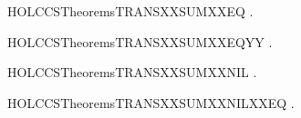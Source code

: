 \newcommand{\HOLCCSTheoremsTRANSXXSUM}{\UseVerbatim{HOLCCSTheoremsTRANSXXSUM}}
\begin{SaveVerbatim}{HOLCCSTheoremsTRANSXXSUMXXEQ}
\HOLTokenTurnstile{} \HOLSymConst{\HOLTokenForall{}}   .  \HOLSymConst{\ensuremath{+}}  \HOLTokenTransBegin{}\HOLTokenTransEnd {} \HOLSymConst{\HOLTokenEquiv{}}  \HOLTokenTransBegin{}\HOLTokenTransEnd {} \HOLSymConst{\HOLTokenDisj{}}  \HOLTokenTransBegin{}\HOLTokenTransEnd {}
\end{SaveVerbatim}
\newcommand{\HOLCCSTheoremsTRANSXXSUMXXEQ}{\UseVerbatim{HOLCCSTheoremsTRANSXXSUMXXEQ}}
\begin{SaveVerbatim}{HOLCCSTheoremsTRANSXXSUMXXEQYY}
\HOLTokenTurnstile{} \HOLSymConst{\HOLTokenForall{}}   .  \HOLSymConst{\ensuremath{+}}  \HOLTokenTransBegin{}\HOLTokenTransEnd {} \HOLSymConst{\HOLTokenEquiv{}}  \HOLTokenTransBegin{}\HOLTokenTransEnd {} \HOLSymConst{\HOLTokenDisj{}}  \HOLTokenTransBegin{}\HOLTokenTransEnd {}
\end{SaveVerbatim}
\newcommand{\HOLCCSTheoremsTRANSXXSUMXXEQYY}{\UseVerbatim{HOLCCSTheoremsTRANSXXSUMXXEQYY}}
\begin{SaveVerbatim}{HOLCCSTheoremsTRANSXXSUMXXNIL}
\HOLTokenTurnstile{} \HOLSymConst{\HOLTokenForall{}}  .  \HOLSymConst{\ensuremath{+}}  \HOLTokenTransBegin{}\HOLTokenTransEnd {} \HOLSymConst{\HOLTokenImp{}}  \HOLTokenTransBegin{}\HOLTokenTransEnd {}
\end{SaveVerbatim}
\newcommand{\HOLCCSTheoremsTRANSXXSUMXXNIL}{\UseVerbatim{HOLCCSTheoremsTRANSXXSUMXXNIL}}
\begin{SaveVerbatim}{HOLCCSTheoremsTRANSXXSUMXXNILXXEQ}
\HOLTokenTurnstile{} \HOLSymConst{\HOLTokenForall{}}  .  \HOLSymConst{\ensuremath{+}}  \HOLTokenTransBegin{}\HOLTokenTransEnd {} \HOLSymConst{\HOLTokenEquiv{}}  \HOLTokenTransBegin{}\HOLTokenTransEnd {}
\end{SaveVerbatim}
